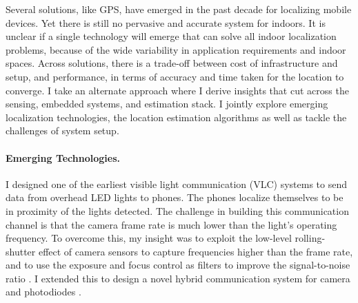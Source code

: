 \documentclass[10pt]{article}
\begin{document}
Several solutions, like GPS, have emerged in the past decade for localizing mobile devices. Yet there is still no pervasive and accurate system for indoors.  
It is unclear if a single technology will emerge that can solve all indoor localization problems, because of the wide variability in application requirements and indoor spaces.  
Across solutions, there is a trade-off between cost of infrastructure and setup, and performance, in terms of accuracy and time taken for the location to converge. I take an alternate approach where I derive insights that cut across the sensing, embedded systems, and estimation stack. I jointly explore emerging localization technologies, the location estimation algorithms as well as tackle the challenges of system setup. 


\paragraph{Emerging Technologies. }

I designed one of the earliest visible light communication (VLC) systems to send data from overhead LED lights to phones. The phones localize themselves to be in proximity of the lights detected. The challenge in building this communication channel is that the camera frame rate is much lower than the light's operating frequency. 
To overcome this, my insight was to exploit the low-level rolling-shutter effect of camera sensors to capture frequencies higher than the frame rate, %
 and to use the exposure and focus control as filters to improve the signal-to-noise ratio \cite{rajagopal2014visual, rajagopal2014demonstration}. I extended this to design a novel hybrid communication system for camera and photodiodes \cite{rajagopal2014hybrid}. 
\end{document}
